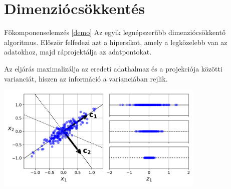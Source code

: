 \documentclass[english, aspectratio=169]{beamer}
\makeatletter
\let\origtableofcontents=\tableofcontents
\def\tableofcontents{\@ifnextchar[{\origtableofcontents}{\gobbletableofcontents}}
\def\gobbletableofcontents#1{\origtableofcontents}
\makeatother
\begin{document}
\section{Dimenziócsökkentés}

\begin{frame}
\tableofcontents[currentsection]
\end{frame}

\begin{frame}{Főkomponenselemzés [\href{https://www.geogebra.org/m/xhh6dbah}{demo}]}
Az egyik legnépszerűbb dimenziócsökkentő algoritmus. Először felfedezi azt a hipersíkot, amely a legközelebb van az adatokhoz, majd ráprojektálja az adatpontokat.\par\smallskip
Az eljárás maximalizálja az eredeti adathalmaz és a projekciója közötti varianciát, hiszen az információ a varianciában rejlik.
\begin{center}
\includegraphics[width=10cm, keepaspectratio]{images/unsupervised_12.png}
\end{center}
\end{frame}
\end{document}
